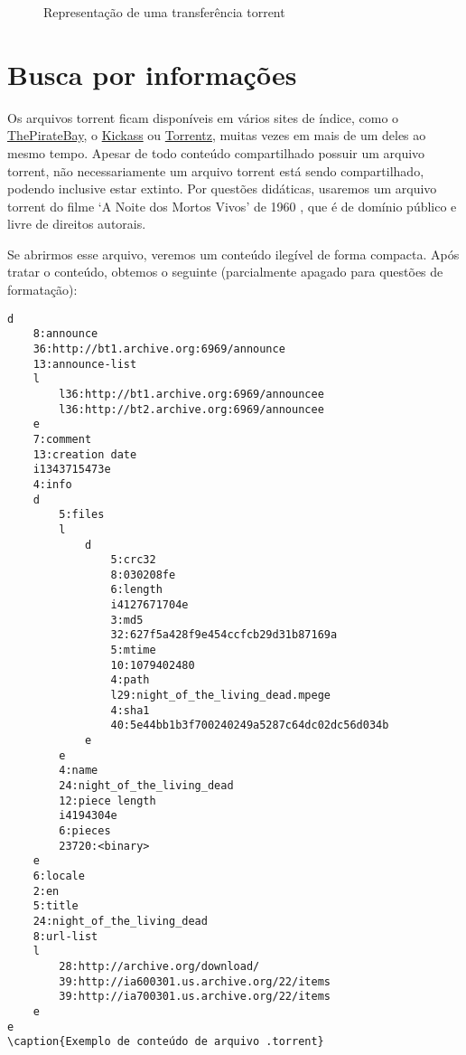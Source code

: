 \begin{figure}
    \vspace{\myvsize}

    \begin{subfigure}[hb!]{\myhsize}
        \caption{}
        \label{fig:torrent-repr-9}
    \end{subfigure}

    \caption{Representação de uma transferência torrent}
    \label{fig:torrent-repr}
\end{figure}

\newpage

\section{Busca por informações}

Os arquivos \gls*{torrent} ficam disponíveis em vários sites de índice, como o
\href{http://thepiratebay.sx/}{ThePirateBay}, o \href{http://kickass.to/}{Kickass} ou
\href{https://torrentz.eu/}{Torrentz}, muitas vezes em mais de um deles ao mesmo tempo.
Apesar de todo conteúdo compartilhado possuir um arquivo \gls*{torrent}, não
necessariamente um arquivo \gls*{torrent} está sendo compartilhado, podendo inclusive
estar extinto. Por questões didáticas, usaremos um arquivo torrent do filme `A Noite
dos Mortos Vivos' de 1960 \cite{torrent-file}, que é de domínio público e livre de
direitos autorais.

Se abrirmos esse arquivo, veremos um conteúdo ilegível de forma compacta. Após tratar o
conteúdo, obtemos o seguinte (parcialmente apagado para questões de formatação):

\begin{verbatim}
d
    8:announce
    36:http://bt1.archive.org:6969/announce
    13:announce-list
    l
        l36:http://bt1.archive.org:6969/announcee
        l36:http://bt2.archive.org:6969/announcee
    e
    7:comment
    13:creation date
    i1343715473e
    4:info
    d
        5:files
        l
            d
                5:crc32
                8:030208fe
                6:length
                i4127671704e
                3:md5
                32:627f5a428f9e454ccfcb29d31b87169a
                5:mtime
                10:1079402480
                4:path
                l29:night_of_the_living_dead.mpege
                4:sha1
                40:5e44bb1b3f700240249a5287c64dc02dc56d034b
            e
        e
        4:name
        24:night_of_the_living_dead
        12:piece length
        i4194304e
        6:pieces
        23720:<binary>
    e
    6:locale
    2:en
    5:title
    24:night_of_the_living_dead
    8:url-list
    l
        28:http://archive.org/download/
        39:http://ia600301.us.archive.org/22/items
        39:http://ia700301.us.archive.org/22/items
    e
e
\caption{Exemplo de conteúdo de arquivo .torrent}
\end{verbatim}

